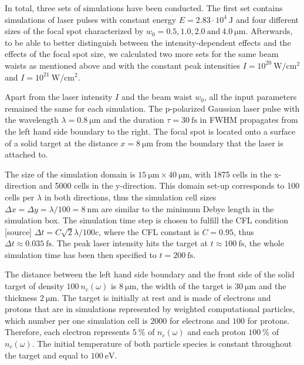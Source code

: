 In total, three sets of simulations have been conducted. The first set contains simulations of laser pulses with constant energy $ E = 2.83 \cdot 10^{4} \ \mathrm{J} $ and four different sizes of the focal spot characterized by $ w_0 = 0.5, 1.0, 2.0 \ \mathrm{and} \ 4.0 \ \mathrm{\mu m} $. Afterwards, to be able to better distinguish between the intensity-dependent effects and the effects of the focal spot size, we calculated two more sets for the same beam waists as mentioned above and with the constant peak intensities $ I = 10^{20} \ \mathrm{W/cm^2} $ and $ I = 10^{21} \ \mathrm{W/cm^2} $.

Apart from the laser intensity $ I $ and the beam waist $ w_0 $, all the input parameters remained the same for each simulation. The p-polarized Gaussian laser pulse with the wavelength $ \lambda = 0.8 \ \mathrm{\mu m} $ and the duration $ \tau = 30 \ \mathrm{fs} $ in FWHM propagates from the left hand side boundary to the right. The focal spot is located onto a surface of a solid target at the distance $ x = 8 \ \mathrm{\mu m} $ from the boundary that the laser is attached to. 

The size of the simulation domain is $ 15 \ \mathrm{\mu m} \times 40 \ \mathrm{\mu m} $, with 1875 cells in the x-direction and 5000 cells in the y-direction. This domain set-up corresponds to 100 cells per $ \lambda $ in both directions, thus the simulation cell sizes $ \Delta x = \Delta y = \lambda/100 = 8 \ \mathrm{nm} $ are similar to the minimum Debye length in the simulation box. The simulation time step is chosen to fulfill the CFL condition [source] $ \Delta t = C \sqrt{2} \lambda/ 100 c $, where the CFL constant is $ C = 0.95 $, thus $ \Delta t \approx 0.035 \ \mathrm{fs} $. The peak laser intensity hits the target at $ t \approx 100 \ \mathrm{fs} $, the whole simulation time has been then specified to $ t = 200 \ \mathrm{fs} $.

The distance between the left hand side boundary and the front side of the solid target of density $ 100 \ n_c \left(\omega \right) $ is $ 8 \ \mathrm{\mu m} $, the width of the target is $ 30 \ \mathrm{\mu m} $ and the thickness $ 2 \ \mathrm{\mu m} $. The target is initially at rest and is made of electrons and protons that are in simulations represented by weighted computational particles, which number per one simulation cell is $ 2000 $ for electrons and $ 100 $ for protons. Therefore, each electron represents $ 5 \ \% $ of $ n_c \left(\omega \right) $ and each proton $ 100 \ \% $ of $ n_c \left(\omega \right) $. The initial temperature of both particle species is constant throughout the target and equal to $ 100 \ \mathrm{eV} $.

